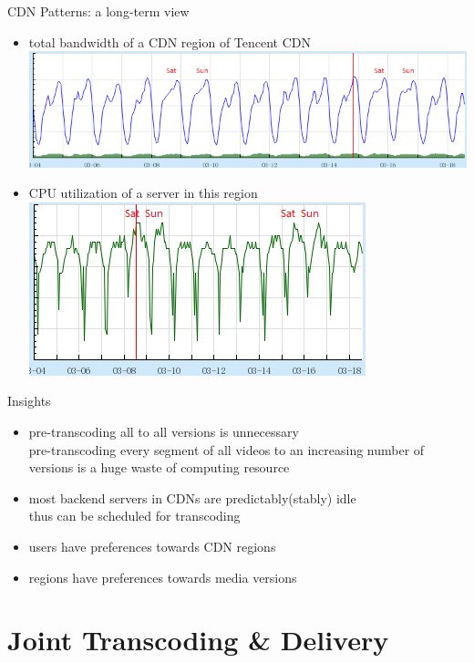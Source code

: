 \documentclass{beamer}
\begin{document}
\begin{frame}{CDN Patterns: a long-term view}
	\begin{itemize}
		\item<1> total bandwidth of a CDN region of Tencent CDN\\
			\includegraphics[width=0.7\linewidth]{fig/bandwidth.png}
		\item<1> CPU utilization of a server in this region\\
			\includegraphics[width=0.7\linewidth]{fig/cpu_utilization.png}	
	\end{itemize}
\end{frame}

\begin{frame}{Insights}
	\begin{itemize}
		\item<1> pre-transcoding all to all versions is unnecessary\\
		pre-transcoding every segment of all videos to an increasing number of versions is a huge waste of computing resource
		\item<1> most backend servers in CDNs are predictably(stably) idle\\
		thus can be scheduled for transcoding
		\item<1> users have preferences towards CDN regions\\
		\item<1> regions have preferences towards media versions\\
	\end{itemize}
\end{frame}

\section{Joint Transcoding \& Delivery}
\end{document}
